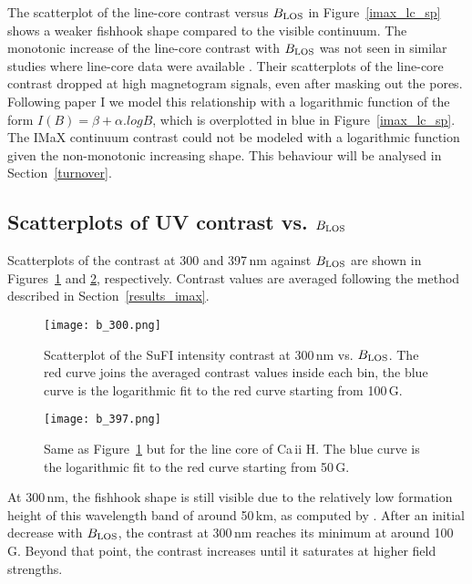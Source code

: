 \documentclass[goettingen, gauss, print]{thesis}
\begin{document}
The scatterplot of the line-core contrast versus $B_{\rm LOS}$ in Figure~\ref{imax_lc_sp} shows a weaker fishhook shape compared to the visible continuum. The monotonic increase of the line-core contrast with $B_{\rm LOS}$ was not seen in similar studies where line-core data were available \citep[]{title_differences_1992, yeo_intensity_2013}. Their scatterplots of the line-core contrast dropped at high magnetogram signals, even after masking out the pores.
Following paper I we model this relationship with a logarithmic function of the form $I(B) = \beta + \alpha.log B$, which is overplotted in blue in Figure~\ref{imax_lc_sp}. The IMaX continuum contrast could not be modeled with a logarithmic function given the non-monotonic increasing shape. This behaviour will be analysed in Section~\ref{turnover}.



\subsection{Scatterplots of UV contrast vs. $B_{\rm LOS}$}
\label{results_sufi}
Scatterplots of the contrast at 300 and 397\,nm against $B_{\rm LOS}$ are shown in Figures~\ref{sufi_300_sp} and \ref{sufi_397_sp}, respectively. Contrast values are averaged following the method described in Section~\ref{results_imax}.

\begin{figure}
\centering
\texttt{[image: b\_300.png]}
\caption{Scatterplot of the SuFI intensity contrast at 300\,nm vs. $B_{\rm LOS}$. The red curve joins the averaged contrast values inside each bin, the blue curve is the logarithmic fit to the red curve starting from 100\,G.}
\label{sufi_300_sp}
\end{figure}

\begin{figure}
\centering
\texttt{[image: b\_397.png]}
\caption{Same as Figure~\ref{sufi_300_sp} but for the line core of Ca\,{\sc ii} H. The blue curve is the logarithmic fit to the red curve starting from 50\,G.}
\label{sufi_397_sp}
\end{figure}


At 300\,nm, the fishhook shape is still visible due to the relatively low formation height of this wavelength band of around 50\,km, as computed by  \cite{jafarzadeh_high-frequency_2017}. After an initial decrease with $B_{\rm LOS}$, the contrast at 300\,nm reaches its minimum  at around 100\,G. Beyond that point, the contrast increases until it saturates at higher field strengths.
\end{document}
